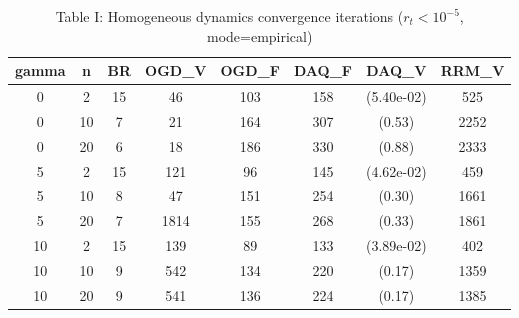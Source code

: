 \begin{table}[htbp]
\centering
\caption{Table I: Homogeneous dynamics convergence iterations ($r_t < 10^{-5}$, mode=empirical)}
\label{tab:table1_empirical}
\begin{tabular}{cccccccc}
\hline
gamma & n & BR & OGD_V & OGD_F & DAQ_F & DAQ_V & RRM_V \\
\hline
0 & 2 & 15 & 46 & 103 & 158 & (5.40e-02) & 525 \\
0 & 10 & 7 & 21 & 164 & 307 & (0.53) & 2252 \\
0 & 20 & 6 & 18 & 186 & 330 & (0.88) & 2333 \\
5 & 2 & 15 & 121 & 96 & 145 & (4.62e-02) & 459 \\
5 & 10 & 8 & 47 & 151 & 254 & (0.30) & 1661 \\
5 & 20 & 7 & 1814 & 155 & 268 & (0.33) & 1861 \\
10 & 2 & 15 & 139 & 89 & 133 & (3.89e-02) & 402 \\
10 & 10 & 9 & 542 & 134 & 220 & (0.17) & 1359 \\
10 & 20 & 9 & 541 & 136 & 224 & (0.17) & 1385 \\
\hline
\end{tabular}
\end{table}
